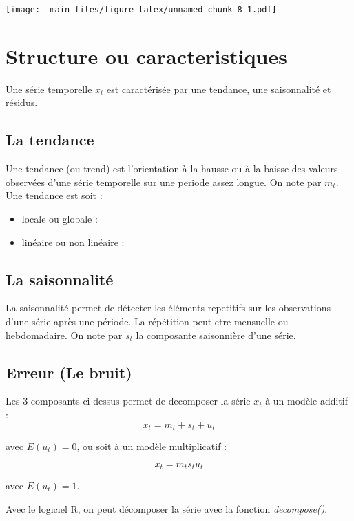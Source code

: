 \documentclass[
]{book}
\providecommand{\tightlist}{%
  \setlength{\itemsep}{0pt}\setlength{\parskip}{0pt}}
\theoremstyle{definition}
\theoremstyle{definition}
\theoremstyle{definition}
\theoremstyle{definition}
\theoremstyle{remark}
\begin{document}
\texttt{[image: \_main\_files/figure-latex/unnamed-chunk-8-1.pdf]}

\hypertarget{structure-ou-caracteristiques}{%
\section{Structure ou caracteristiques}\label{structure-ou-caracteristiques}}

Une série temporelle \(x_t\) est caractérisée par une tendance, une saisonnalité et résidus.

\hypertarget{la-tendance}{%
\subsection{La tendance}\label{la-tendance}}

Une tendance (ou trend) est l'orientation à la hausse ou à la baisse des valeurs observées d'une série temporelle sur une periode assez longue. On note par \(m_t\). Une tendance est soit :

\begin{itemize}
\tightlist
\item
  locale ou globale :
\item
  linéaire ou non linéaire :
\end{itemize}

\hypertarget{la-saisonnalituxe9}{%
\subsection{La saisonnalité}\label{la-saisonnalituxe9}}

La saisonnalité permet de détecter les éléments repetitifs sur les observations d'une série après une période. La répétition peut etre mensuelle ou hebdomadaire. On note par \(s_t\) la composante saisonnière d'une série.

\hypertarget{erreur-le-bruit}{%
\subsection{Erreur (Le bruit)}\label{erreur-le-bruit}}

Les 3 composants ci-dessus permet de decomposer la série \(x_t\) à un modèle additif :
\[x_t = m_t+s_t+u_t\]

avec \(E(u_t)=0\), ou soit à un modèle multiplicatif :

\[x_t = m_ts_tu_t\]

avec \(E(u_t)=1\).

Avec le logiciel R, on peut décomposer la série avec la fonction \emph{decompose()}.
\end{document}

